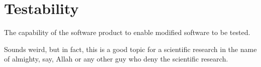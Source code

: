 \section{Testability}
\label{sec:Testability}

The capability of the software product to enable modified software to be tested.

Sounds weird, but in fact, this is a good topic for a scientific research in the name of almighty, say, Allah or any other guy who deny the scientific research.
